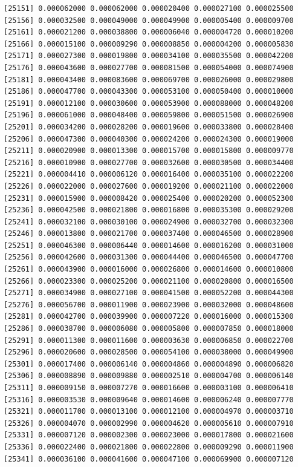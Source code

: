 \documentclass[]{article}
\begin{document}
\begin{verbatim}
[25151] 0.000062000 0.000062000 0.000020400 0.000027100 0.000025500
[25156] 0.000032500 0.000049000 0.000049900 0.000005400 0.000009700
[25161] 0.000021200 0.000038800 0.000006040 0.000004720 0.000010200
[25166] 0.000015100 0.000009290 0.000008850 0.000004200 0.000005830
[25171] 0.000027300 0.000019800 0.000034100 0.000035500 0.000042200
[25176] 0.000043600 0.000027700 0.000081500 0.000054000 0.000074900
[25181] 0.000043400 0.000083600 0.000069700 0.000026000 0.000029800
[25186] 0.000047700 0.000043300 0.000053100 0.000050400 0.000010000
[25191] 0.000012100 0.000030600 0.000053900 0.000088000 0.000048200
[25196] 0.000061000 0.000048400 0.000059800 0.000051500 0.000026900
[25201] 0.000034200 0.000028200 0.000019600 0.000033800 0.000028400
[25206] 0.000047300 0.000040300 0.000024200 0.000024300 0.000019000
[25211] 0.000020900 0.000013300 0.000015700 0.000015800 0.000009770
[25216] 0.000010900 0.000027700 0.000032600 0.000030500 0.000034400
[25221] 0.000004410 0.000006120 0.000016400 0.000035100 0.000022200
[25226] 0.000022000 0.000027600 0.000019200 0.000021100 0.000022000
[25231] 0.000015900 0.000008420 0.000025400 0.000020200 0.000052300
[25236] 0.000042500 0.000021800 0.000016800 0.000035300 0.000029200
[25241] 0.000032100 0.000030100 0.000024900 0.000032700 0.000032300
[25246] 0.000013800 0.000021700 0.000037400 0.000046500 0.000028900
[25251] 0.000046300 0.000006440 0.000014600 0.000016200 0.000031000
[25256] 0.000042600 0.000031300 0.000044400 0.000046500 0.000047700
[25261] 0.000043900 0.000016000 0.000026800 0.000014600 0.000010800
[25266] 0.000023300 0.000025200 0.000021100 0.000020800 0.000016500
[25271] 0.000034900 0.000027100 0.000041500 0.000052200 0.000044300
[25276] 0.000056700 0.000011900 0.000023900 0.000032000 0.000048600
[25281] 0.000042700 0.000039900 0.000007220 0.000016000 0.000015300
[25286] 0.000038700 0.000006080 0.000005800 0.000007850 0.000018000
[25291] 0.000011300 0.000011600 0.000003630 0.000006850 0.000022700
[25296] 0.000020600 0.000028500 0.000054100 0.000038000 0.000049900
[25301] 0.000017400 0.000006140 0.000004860 0.000004890 0.000006820
[25306] 0.000008890 0.000009880 0.000002510 0.000004700 0.000006140
[25311] 0.000009150 0.000007270 0.000016600 0.000003100 0.000006410
[25316] 0.000003530 0.000009640 0.000014600 0.000006240 0.000007770
[25321] 0.000011700 0.000013100 0.000012100 0.000004970 0.000003710
[25326] 0.000004070 0.000002990 0.000004620 0.000005610 0.000007910
[25331] 0.000007120 0.000002300 0.000023000 0.000017800 0.000021600
[25336] 0.000022400 0.000021800 0.000022800 0.000009290 0.000011900
[25341] 0.000036100 0.000041600 0.000047100 0.000069900 0.000007120

\end{verbatim}
\end{document}

